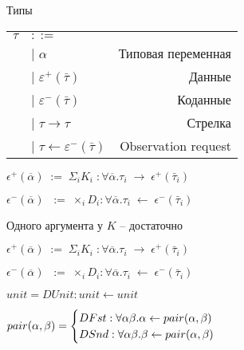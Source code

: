 \documentclass[10pt, mathserif]{beamer}
\let\\\tabularnewline
\let\\\tabularnewline
\theoremstyle{definition}
\begin{document}
\begin{frame}[c]{Типы}
\begin{tabular}{l l r}
  $\tau$ & $::=$ & \\
  &| $\alpha$ & Типовая переменная \\
  &| $\varepsilon^+(\bar{\tau})$  & Данные \\
  &| $\varepsilon^-(\bar{\tau})$  & Коданные \\
  &| $\tau \to \tau$ & Стрелка \\
  &| $\tau \leftarrow \varepsilon^-(\bar{\tau})$ & Observation request \\
\end{tabular}

\vspace{1cm}
\centering
$\epsilon^+(\overline{\alpha})\;:=\; \Sigma_i K_i \;:\forall\overline{\alpha}.\tau_i \;\to       \;\epsilon^+(\bar{\tau}_i)$

$\epsilon^-(\overline{\alpha})\;\;:=\; \times_i D_i   :\forall\overline{\alpha}.\tau_i \;\leftarrow\;\epsilon^-(\bar{\tau}_i)$
\end{frame}

\begin{frame}[c]{Одного аргумента у $K$ -- достаточно}

\centering
$\epsilon^+(\overline{\alpha})\;:=\; \Sigma_i K_i \;:\forall\overline{\alpha}.\tau_i \;\to       \;\epsilon^+(\bar{\tau}_i)$

$\epsilon^-(\overline{\alpha})\;\;:=\; \times_i D_i   :\forall\overline{\alpha}.\tau_i \;\leftarrow\;\epsilon^-(\bar{\tau}_i)$
\vspace{1cm}

$unit = DUnit : unit \leftarrow unit$
\vspace{.5cm}

$pair(\alpha,\beta) = \begin{cases}
    DFst : \forall\alpha \beta . \alpha \leftarrow pair(\alpha,\beta) \\
    DSnd : \forall\alpha \beta . \beta  \leftarrow pair(\alpha,\beta)
\end{cases}$
\end{frame}
\end{document}
